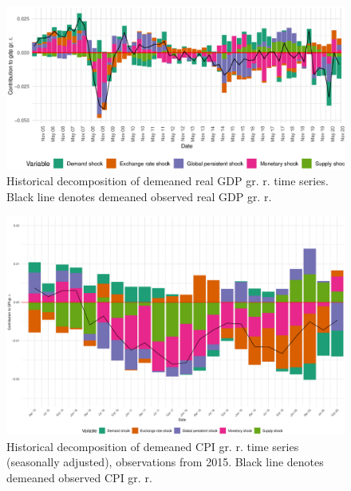 \documentclass[12pt, a4paper]{extarticle}
\begin{document}
\begin{figure}[h!]
	\centering
	\includegraphics[width=0.95\linewidth]{figures/hd_gdp_full}
	\caption[]{Historical decomposition of demeaned real GDP gr. r. time series. Black line denotes demeaned observed real GDP gr. r.}
	\label{fig:hd_gdp_full}
\end{figure}

\begin{figure}
	\centering
	\includegraphics[width=0.95\linewidth]{figures/hd_cpi_cut}
	\caption[]{Historical decomposition of demeaned CPI gr. r. time series (seasonally adjusted), observations from 2015. Black line denotes demeaned observed CPI gr. r.}
	\label{fig:hd_cpi_cut}
\end{figure}
\end{document}
